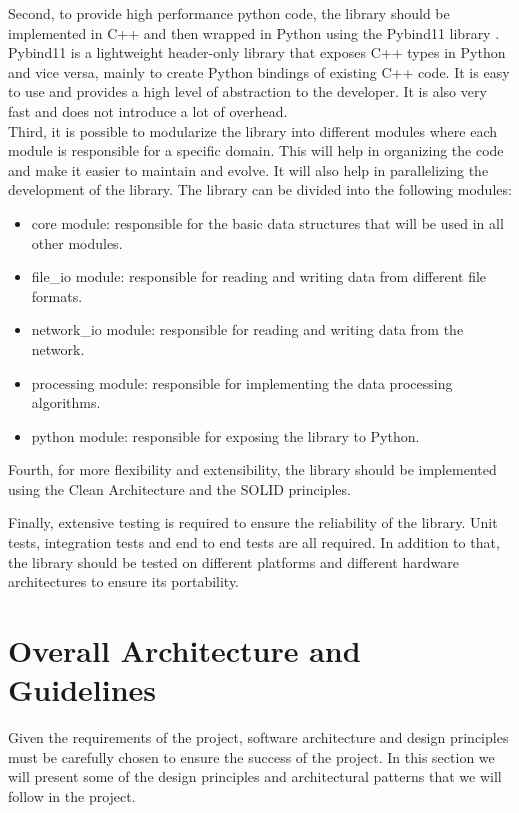 \begin{spacing}{1.2}
    Second, to provide high performance python code, the library should be implemented in C++ and then wrapped in Python using the Pybind11 library \cite{pybind11}.
    Pybind11 is a lightweight header-only library that exposes C++ types in Python and vice versa, mainly to create Python bindings of existing C++ code.
    It is easy to use and provides a high level of abstraction to the developer. It is also very fast and does not introduce a lot of overhead.\\
    

    Third, it is possible to modularize the library into different modules where each module is responsible for a specific domain.
    This will help in organizing the code and make it easier to maintain and evolve. It will also help in parallelizing the development of the library.
    The library can be divided into the following modules:
    \begin{itemize}
        \item core module: responsible for the basic data structures that will be used in all other modules.
        \item file\_io module: responsible for reading and writing data from different file formats.
        \item network\_io module: responsible for reading and writing data from the network.
        \item processing module: responsible for implementing the data processing algorithms.
        \item python module: responsible for exposing the library to Python.
    \end{itemize}

    Fourth, for more flexibility and extensibility, the library should be implemented using the Clean Architecture and the SOLID principles.

    Finally, extensive testing is required to ensure the reliability of the library. Unit tests, integration tests and end to end tests are all required.
    In addition to that, the library should be tested on different platforms and different hardware architectures to ensure its portability.















    \section{Overall Architecture and Guidelines}
    Given the requirements of the project, software architecture and design principles must be carefully chosen to ensure the success of the project.
    In this section we will present some of the design principles and architectural patterns that we will follow in the project.
    \\


\end{spacing}
